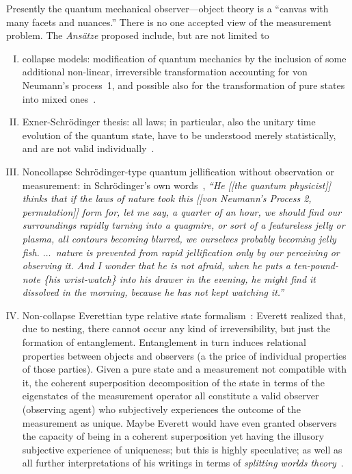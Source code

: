 Presently the quantum mechanical observer---object theory is a ``canvas with many facets and nuances.''
There is no one accepted view of the measurement problem.
The {\em Ans\"atze} proposed include, but are not limited to
\begin{enumerate}[(I)]
\item
collapse models: modification of quantum mechanics by the inclusion of some additional non-linear,
irreversible transformation accounting for von Neumann's process~1,
and possible also for the transformation of pure states into mixed ones~\cite{Ghirardi-GRW-86PhysRevD.34.470,Frigg2009,sep-qm-collapse,Vaidman2014}.

\item
{}
Exner-Schr\"odinger thesis: all laws; in particular, also the unitary time evolution of the quantum state,
have to be understood merely statistically, and are not valid individually~\cite{Exner-1908,schrodinger-1929,Hanley-1979}.

\item
Noncollapse Schr\"odinger-type quantum jellification without observation or measurement:
in Schr\"odinger's own words~\cite[pp.~19,20]{schroedinger-interpretation},
{\em ``He [[the quantum physicist]] thinks that if the laws of nature took this [[von Neumann's Process 2, permutation]] form for, let
me say, a quarter of an hour, we should find our surroundings rapidly
turning into a quagmire, or sort of a featureless jelly or plasma, all contours
becoming blurred, we ourselves probably becoming jelly fish. $\ldots$~nature is prevented from rapid jellification only by our perceiving or
observing it. And I wonder that he is not afraid, when he puts a ten-pound-note \{his wrist-watch\} into his drawer in the evening, he might
find it dissolved in the morning, because he has not kept watching it.''}

\item
Non-collapse Everettian type relative state
formalism~\cite{everett,everett-collw,everett-1956,Barrett-2011,sep-qm-everett,sep-qm-manyworlds,Vaidman2014}:
Everett realized that, due to nesting, there cannot occur any kind of irreversibility, but just the formation of
entanglement.
Entanglement in turn induces relational properties between objects and observers (a the price of individual properties of those parties).
Given a pure state and a measurement not compatible with it, the coherent superposition decomposition  of the state in terms
of the eigenstates of the measurement operator all constitute a valid observer (observing agent)
who subjectively experiences the outcome of the measurement as unique.
Maybe Everett would have even granted observers the capacity of
being in a coherent superposition yet having the illusory subjective experience of
uniqueness; but this is highly speculative; as well as all further interpretations of his writings in terms of
{\em splitting worlds theory}~\cite{everett-thesis}.


\end{enumerate}
